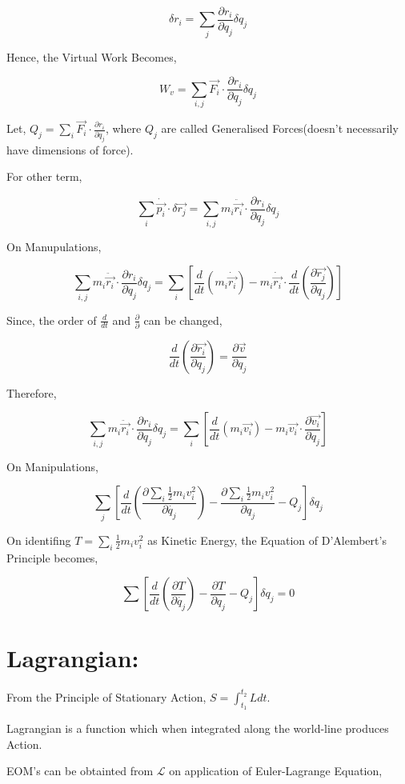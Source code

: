 \documentclass[a4paper]{article}
\newcommand{\Lagr}{\mathcal{L}}
\newcommand{\ddt}{\frac{d}{dt}}
\newcommand{\pdt}[2]{\frac{\partial #1}{\partial #2}}
\newcommand{\half}{\frac{1}{2}}
\begin{document}
			$$ \delta r_i = \sum_j \pdt{r_i}{q_j}\delta q_j $$

			Hence, the Virtual Work Becomes,

			$$ W_v = \sum_{i,j} \vec{F_i} \cdot \pdt{r_i}{q_j}\delta q_j $$

			Let, $Q_j = \sum_i \vec{F_i} \cdot \pdt{r_i}{q_j}$, where $Q_j$ are called Generalised Forces(doesn't necessarily have dimensions of force).

			For other term,

			$$ \sum_i \dot{\vec{p_i}} \cdot \delta \vec{r_j}  = \sum_{i,j} m_i \ddot{\vec{r_i}} \cdot \pdt{r_i}{q_j} \delta q_j $$

			On Manupulations,

			$$ \sum_{i,j} m_i \ddot{\vec{r_i}} \cdot \pdt{r_i}{q_j} \delta q_j = \sum_i[ \ddt (m_i \dot{\vec{r_i}}) - m_i \dot{\vec{r_i}} \cdot \ddt(\pdt{\vec{r_j}}{q_j})] $$
			
			Since, the order of $\ddt$ and $\pdt{}{}$ can be changed,

			$$ \ddt(\pdt{\vec{r_i}}{q_j}) = \pdt{\vec{v}}{q_j} $$

			Therefore,

			$$ \sum_{i,j} m_i \ddot{\vec{r_i}} \cdot \pdt{r_i}{q_j} \delta q_j = \sum_i[ \ddt (m_i \vec{v_i}) - m_i \vec{v_i} \cdot \pdt{\vec{v_i}}{q_j}] $$

			On Manipulations, 

			$$ \sum_j [ \ddt(\pdt{\sum_i \half m_i v_i^2}{\dot{q_j}})  - \pdt{\sum_i \half m_i v_i^2}{q_j} - Q_j]\delta q_j $$

			On identifing $T = \sum_i \half m_i v_i^2$ as Kinetic Energy, the Equation of D'Alembert's Principle becomes,

			\begin{equation}
				\sum[\ddt(\pdt{T}{\dot{q_j}}) - \pdt{T}{q_j} - Q_j]\delta q_j = 0 
			\end{equation}
		
	\section*{Lagrangian: }
		From the Principle of Stationary Action, $S = \int_{t_1}^{t_2} L dt $.

		Lagrangian is a function which when integrated along the world-line produces Action.

		EOM's can be obtainted from $\Lagr$ on application of Euler-Lagrange Equation, \hfill \\
		
\end{document}
